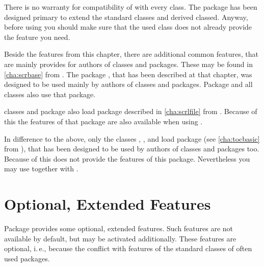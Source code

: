 There is no warranty for compatibility of  with every
class. The package has been designed primary to extend the standard classes
and derived classed. Anyway, before using  you should
make sure that the used class does not already provide the feature you need.

Beside the features from this chapter, there are additional common features,
that are mainly provides for authors of classes and packages. These may be
found in \autoref{cha:scrbase} from . The package
, that has been described at
that chapter, was designed to be used mainly by authors of classes and
packages. Package  and all \KOMAScript{} classes also use
that package.

\KOMAScript{} classes and package  also load package
 described in
\autoref{cha:scrlfile} from . Because of this the
features of that package are also available when using .

\iftrue %
In difference to the above, only the \KOMAScript{} classes ,
, and  load package  (see
\autoref{cha:tocbasic} from ), that has been
designed to be used by authors of classes and packages too. Because of this
 does not provide the features of this package. Nevertheless
you may use  together with .%
\fi




\section{Optional, Extended Features}

Package  provides some optional, extended features. Such
features are not available by default, but may be activated
additionally. These features are optional, i.\,e., because the conflict with
features of the standard classes of often used packages.

